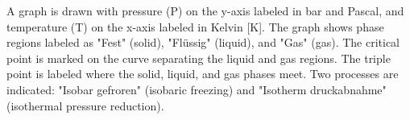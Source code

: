 A graph is drawn with pressure (P) on the y-axis labeled in bar and Pascal, and temperature (T) on the x-axis labeled in Kelvin [K]. The graph shows phase regions labeled as "Fest" (solid), "Flüssig" (liquid), and "Gas" (gas). The critical point is marked on the curve separating the liquid and gas regions. The triple point is labeled where the solid, liquid, and gas phases meet. Two processes are indicated: "Isobar gefroren" (isobaric freezing) and "Isotherm druckabnahme" (isothermal pressure reduction).